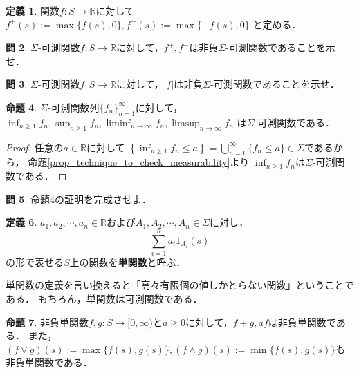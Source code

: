 \documentclass{jsreport}
\theoremstyle{definition}
\newtheorem{defi}{定義}[section]
\newtheorem{prop}[defi]{命題}
\newtheorem{qst}[defi]{問}
\begin{document}
\begin{defi}\label{def_positive_and_negative_part}
関数$f \colon S\to\mathbb{R}$に対して
$f^+(s):=\max\{f(s),0\}, f^-(s):=\max\{-f(s),0\}$
と定める．
\end{defi}

\begin{qst}\label{qst_positive_and_negative_part_are_measurable}
$\Sigma$-可測関数$f \colon S\to\mathbb{R}$に対して，$f^+,f^-$は非負$\Sigma$-可測関数であることを示せ．
\end{qst}

\begin{qst}\label{qst_absolute_is_measurable}
$\Sigma$-可測関数$f \colon S\to\mathbb{R}$に対して，$|f|$は非負$\Sigma$-可測関数であることを示せ．
\end{qst}

\begin{prop}\label{prop_inf_and_sup_are_measurable}
$\Sigma$-可測関数列$\{f_n\}_{n=1}^\infty$に対して，
$\displaystyle\inf_{n\geq1}f_n, \sup_{n\geq1}f_n, \liminf_{n\to\infty}f_n, \limsup_{n\to\infty}f_n$
は$\Sigma$-可測関数である．
\end{prop}

\begin{proof}
任意の$a\in\mathbb{R}$に対して
$\displaystyle\left\{\inf_{n\geq1}f_n \leq a\right\}
=\bigcup_{n=1}^\infty\{f_n \leq a\}\in\Sigma$であるから，
命題\ref{prop_technique_to_check_measurability}より
$\displaystyle\inf_{n\geq1}f_n$は$\Sigma$-可測関数である．
\end{proof}

\begin{qst}\label{qst_inf_and_sup_are_measurable}
命題\ref{prop_inf_and_sup_are_measurable}の証明を完成させよ．
\end{qst}

\begin{defi}\label{def_simple_function}
$a_1,a_2,\cdots,a_n\in\mathbb{R}$および$A_1,A_2,\cdots,A_n\in\Sigma$に対し，
\[ \sum_{i=1}^n a_i1_{A_i}(s) \]
の形で表せる$S$上の関数を\textbf{単関数}と呼ぶ．
\end{defi}

単関数の定義を言い換えると「高々有限個の値しかとらない関数」ということである．
もちろん，単関数は可測関数である．

\begin{prop}\label{prop_properties_of_nonnegative_simple_function}
非負単関数$f,g \colon S\to[0,\infty)$と$a\geq0$に対して，$f+g, af$は非負単関数である．
また，$(f \vee g)(s):=\max\{f(s),g(s)\}, (f \wedge g)(s):=\min\{f(s),g(s)\}$も非負単関数である．
\end{prop}
\end{document}
